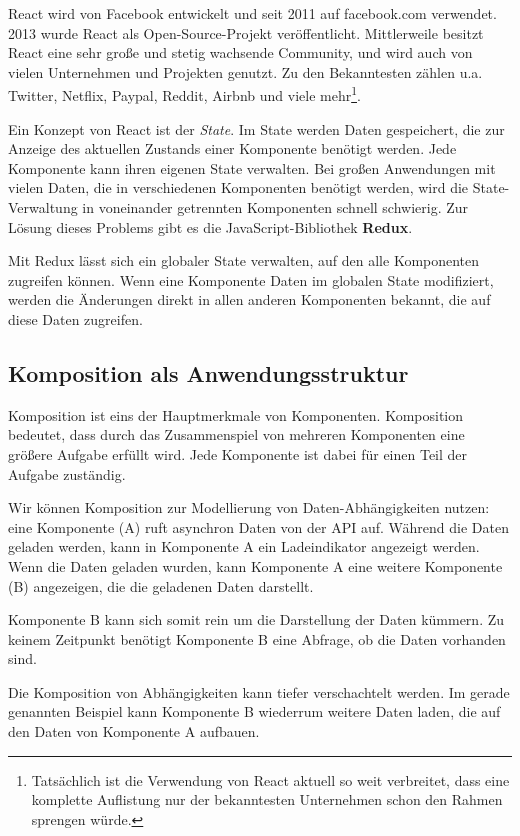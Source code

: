 React wird von Facebook entwickelt und seit 2011 auf facebook.com verwendet. 2013 wurde React als Open-Source-Projekt veröffentlicht. Mittlerweile besitzt React eine sehr große und stetig wachsende Community, und wird auch von vielen Unternehmen und Projekten genutzt. Zu den Bekanntesten zählen u.a. Twitter, Netflix, Paypal, Reddit, Airbnb und viele mehr\footnote{Tatsächlich ist die Verwendung von React aktuell so weit verbreitet, dass eine komplette Auflistung nur der bekanntesten Unternehmen schon den Rahmen sprengen würde.}.

Ein Konzept von React ist der \emph{State}. Im State werden Daten gespeichert, die zur Anzeige des aktuellen Zustands einer Komponente benötigt werden. Jede Komponente kann ihren eigenen State verwalten. Bei großen Anwendungen mit vielen Daten, die in verschiedenen Komponenten benötigt werden, wird die State-Verwaltung in voneinander getrennten Komponenten schnell schwierig. Zur Lösung dieses Problems gibt es die JavaScript-Bibliothek \textbf{Redux}.

Mit Redux lässt sich ein globaler State verwalten, auf den alle Komponenten zugreifen können. Wenn eine Komponente Daten im globalen State modifiziert, werden die Änderungen direkt in allen anderen Komponenten bekannt, die auf diese Daten zugreifen.

\subsection{Komposition als An\-wen\-dungs\-struk\-tur}
\label{subsec:komposition}

Komposition ist eins der Hauptmerkmale von Komponenten. Komposition bedeutet, dass durch das Zusammenspiel von mehreren Komponenten eine größere Aufgabe erfüllt wird. Jede Komponente ist dabei für einen Teil der Aufgabe zuständig. \citep[Kapitel 1]{Maemecke2017}

Wir können Komposition zur Modellierung von Daten-Abhängigkeiten nutzen: eine Komponente (A) ruft asynchron Daten von der \ac{API} auf. Während die Daten geladen werden, kann in Komponente A ein Ladeindikator angezeigt werden. Wenn die Daten geladen wurden, kann Komponente A eine weitere Komponente (B) angezeigen, die die geladenen Daten darstellt.

Komponente B kann sich somit rein um die Darstellung der Daten kümmern. Zu keinem Zeitpunkt benötigt Komponente B eine Abfrage, ob die Daten vorhanden sind.

Die Komposition von Abhängigkeiten kann tiefer verschachtelt werden. Im gerade genannten Beispiel kann Komponente B wiederrum weitere Daten laden, die auf den Daten von Komponente A aufbauen.

